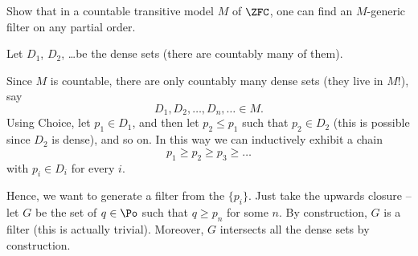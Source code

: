 \begin{problem}
	\label{prob:rslemma}
	Show that in a countable transitive model $M$ of $\ZFC$,
	one can find an $M$-generic filter on any partial order.
	\begin{hint}
		Let $D_1$, $D_2$, \dots be the dense sets (there are countably many of them).
	\end{hint}
	\begin{sol}
	Since $M$ is countable, there are only countably many dense sets (they live in $M$!),
	say \[ D_1, D_2, \ldots, D_n, \ldots \in M. \]
	Using Choice,
	let $p_1 \in D_1$, and then let $p_2 \le p_1$ such that $p_2 \in D_2$
	(this is possible since $D_2$ is dense), and so on.
	In this way we can inductively exhibit a chain
	\[ p_1 \ge p_2 \ge p_3 \ge \dots \]
	with $p_i \in D_i$ for every $i$.

	Hence, we want to generate a filter from the $\{p_i\}$.
	Just take the upwards closure -- let $G$ be the set of $q \in \Po$ such that $q \ge p_n$ for some $n$.
	By construction, $G$ is a filter (this is actually trivial).
	Moreover, $G$ intersects all the dense sets by construction.
	\end{sol}
\end{problem}


